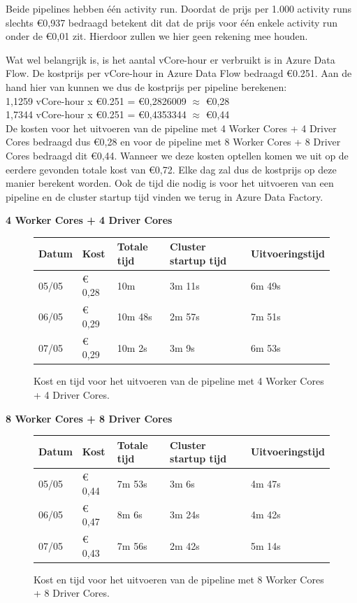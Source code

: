 Beide pipelines hebben één activity run. Doordat de prijs per 1.000 activity runs slechts €0,937 bedraagd betekent dit dat de prijs voor één enkele activity run onder de €0,01 zit. Hierdoor zullen we hier geen rekening mee houden.

Wat wel belangrijk is, is het aantal vCore-hour er verbruikt is in Azure Data Flow. De kostprijs per vCore-hour in Azure Data Flow bedraagd 	€0.251. Aan de hand hier van kunnen we dus de kostprijs per pipeline berekenen:\\


1,1259 vCore-hour x €0.251 = €0,2826009 $\approx$ €0,28\\


1,7344 vCore-hour x €0.251 = €0,4353344 $\approx$ €0,44\\


De kosten voor het uitvoeren van de pipeline met 4 Worker Cores + 4 Driver Cores bedraagd dus €0,28 en voor de pipeline met 8 Worker Cores + 8 Driver Cores bedraagd dit €0,44. Wanneer we deze kosten optellen komen we uit op de eerdere gevonden totale kost van €0,72. Elke dag zal dus de kostprijs op deze manier berekent worden. Ook de tijd die nodig is voor het uitvoeren van een pipeline en de cluster startup tijd vinden we terug in Azure Data Factory. 


\textbf{4 Worker Cores + 4 Driver Cores}

\begin{figure}[H]%
    \centering
    \begin{tabularx}{1\textwidth}{ |X|X|X|X|X| }
        \hline
        \textbf{Datum} & \textbf{Kost} & \textbf{Totale tijd} & \textbf{Cluster startup tijd} & \textbf{Uitvoeringstijd} \\
        \hline 
        05/05 & € 0,28 & 10m & 3m 11s & 6m 49s  \\
        \hline
        06/05 & € 0,29 & 10m 48s & 2m 57s & 7m 51s \\
        \hline
        07/05 & € 0,29 & 10m 2s & 3m 9s & 6m 53s \\
        \hline
    \end{tabularx}
    \caption{Kost en tijd voor het uitvoeren van de pipeline met 4 Worker Cores + 4 Driver Cores.}
\end{figure}


\textbf{8 Worker Cores + 8 Driver Cores}

\begin{figure}[H]%
    \centering
    \begin{tabularx}{1\textwidth}{ |X|X|X|X|X| }
        \hline
        \textbf{Datum} & \textbf{Kost} & \textbf{Totale tijd} & \textbf{Cluster startup tijd} & \textbf{Uitvoeringstijd} \\
        \hline 
        05/05 & € 0,44 & 7m 53s & 3m 6s & 4m 47s  \\
        \hline
        06/05 & € 0,47 & 8m 6s & 3m 24s & 4m 42s \\
        \hline
        07/05 & € 0,43 & 7m 56s & 2m 42s & 5m 14s \\
        \hline
    \end{tabularx}
    \caption{Kost en tijd voor het uitvoeren van de pipeline met 8 Worker Cores + 8 Driver Cores.}
\end{figure}

